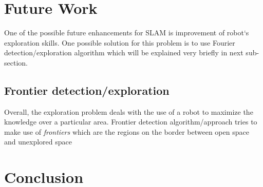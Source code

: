 \documentclass{ba-kecs}
\numberwithin{figure}{section}
\numberwithin{equation}{section}
\begin{document}

\section{Future Work}

	One of the possible future enhancements for SLAM is improvement of robot`s exploration skills. One possible solution for this problem is to use Fourier detection/exploration algorithm which will be explained very briefly in next sub-section.
	
\subsection{Frontier detection/exploration}
	Overall, the exploration problem deals with the use of a robot to maximize the knowledge over a particular area. Frontier detection algorithm/approach tries to make use of \textit{frontiers} which are the regions on the border between open space and unexplored space \cite{frontier}


\section{Conclusion}



\end{document}
